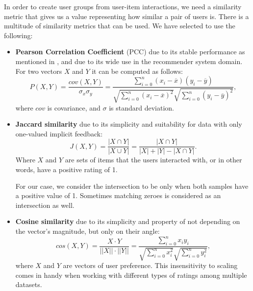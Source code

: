 In order to create user groups from user-item interactions, we need a similarity metric that gives us a value representing how similar a pair of users is. There is a multitude of similarity metrics that can be used. We have selected to use the following: 
\begin{itemize}
    \item 
        \textbf{Pearson Correlation Coefficient} (PCC) due to its stable performance as mentioned in \cite{similarity_measures_comparason}, and due to its wide use in the recommender system domain.
        For two vectors $X$ and $Y$ it can be computed as follows:
        \begin{equation}
            P(X,Y) = \frac{cov(X,Y)}{\sigma_x \sigma_y}
            = \frac{\sum\limits_{i=0}^{n} (x_i - \overline{x})(y_i - \overline{y})}{\sqrt{\sum\limits_{i=0}^{n} (x_i - \overline{x})^2}\sqrt{\sum\limits_{i=0}^{n}(y_i - \overline{y})^2}},
        \end{equation}
        where $cov$ is covariance, and $\sigma$ is standard deviation.
        
        
    \item
        \textbf{Jaccard similarity} due to its simplicity and suitability for data with only one-valued implicit feedback:
        \begin{equation}
            J(X,Y) = \frac{|X \cap Y|}{|X \cup Y|} = \frac{|X \cap Y|}{|X| + |Y| - |X \cap Y|}.
        \end{equation}
        Where $X$ and $Y$ are sets of items that the users interacted with, or in other words, have a positive rating of 1.
        
        For our case, we consider the intersection to be only when both samples have a positive value of 1. Sometimes matching zeroes is considered as an intersection as well.
        
    \item
        \textbf{Cosine similarity} due to its simplicity and property of not depending on the vector's magnitude, but only on their angle:
        \begin{equation}
            cos(X, Y) = \frac {X \cdot Y}{||X|| \cdot ||Y||}
             = \frac{\sum\limits_{i=0}^{n}{x_i y_i}} {\sqrt{\sum\limits_{i=0}^{n}{x_i^2}}\sqrt{\sum\limits_{i=0}^{n}{y_i^2}}}
            ,
        \end{equation}
        where $X$ and $Y$ are vectors of user preference.
        This insensitivity to scaling comes in handy when working with different types of ratings among multiple datasets.
\end{itemize}

